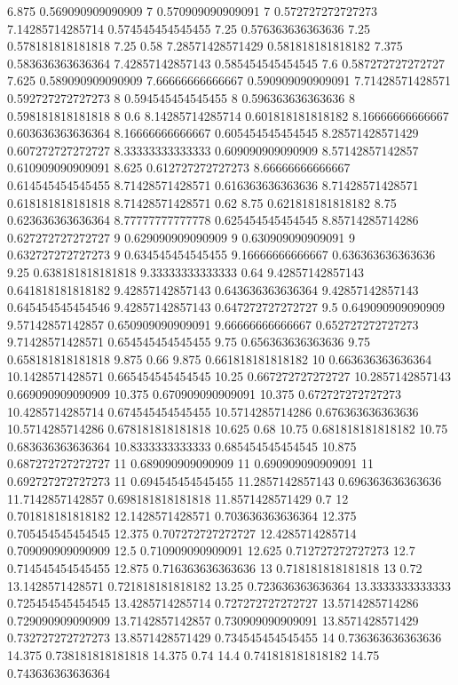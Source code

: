{6.875 0.569090909090909
7 0.570909090909091
7 0.572727272727273
7.14285714285714 0.574545454545455
7.25 0.576363636363636
7.25 0.578181818181818
7.25 0.58
7.28571428571429 0.581818181818182
7.375 0.583636363636364
7.42857142857143 0.585454545454545
7.6 0.587272727272727
7.625 0.589090909090909
7.66666666666667 0.590909090909091
7.71428571428571 0.592727272727273
8 0.594545454545455
8 0.596363636363636
8 0.598181818181818
8 0.6
8.14285714285714 0.601818181818182
8.16666666666667 0.603636363636364
8.16666666666667 0.605454545454545
8.28571428571429 0.607272727272727
8.33333333333333 0.609090909090909
8.57142857142857 0.610909090909091
8.625 0.612727272727273
8.66666666666667 0.614545454545455
8.71428571428571 0.616363636363636
8.71428571428571 0.618181818181818
8.71428571428571 0.62
8.75 0.621818181818182
8.75 0.623636363636364
8.77777777777778 0.625454545454545
8.85714285714286 0.627272727272727
9 0.629090909090909
9 0.630909090909091
9 0.632727272727273
9 0.634545454545455
9.16666666666667 0.636363636363636
9.25 0.638181818181818
9.33333333333333 0.64
9.42857142857143 0.641818181818182
9.42857142857143 0.643636363636364
9.42857142857143 0.645454545454546
9.42857142857143 0.647272727272727
9.5 0.649090909090909
9.57142857142857 0.650909090909091
9.66666666666667 0.652727272727273
9.71428571428571 0.654545454545455
9.75 0.656363636363636
9.75 0.658181818181818
9.875 0.66
9.875 0.661818181818182
10 0.663636363636364
10.1428571428571 0.665454545454545
10.25 0.667272727272727
10.2857142857143 0.669090909090909
10.375 0.670909090909091
10.375 0.672727272727273
10.4285714285714 0.674545454545455
10.5714285714286 0.676363636363636
10.5714285714286 0.678181818181818
10.625 0.68
10.75 0.681818181818182
10.75 0.683636363636364
10.8333333333333 0.685454545454545
10.875 0.687272727272727
11 0.689090909090909
11 0.690909090909091
11 0.692727272727273
11 0.694545454545455
11.2857142857143 0.696363636363636
11.7142857142857 0.698181818181818
11.8571428571429 0.7
12 0.701818181818182
12.1428571428571 0.703636363636364
12.375 0.705454545454545
12.375 0.707272727272727
12.4285714285714 0.709090909090909
12.5 0.710909090909091
12.625 0.712727272727273
12.7 0.714545454545455
12.875 0.716363636363636
13 0.718181818181818
13 0.72
13.1428571428571 0.721818181818182
13.25 0.723636363636364
13.3333333333333 0.725454545454545
13.4285714285714 0.727272727272727
13.5714285714286 0.729090909090909
13.7142857142857 0.730909090909091
13.8571428571429 0.732727272727273
13.8571428571429 0.734545454545455
14 0.736363636363636
14.375 0.738181818181818
14.375 0.74
14.4 0.741818181818182
14.75 0.743636363636364
}
